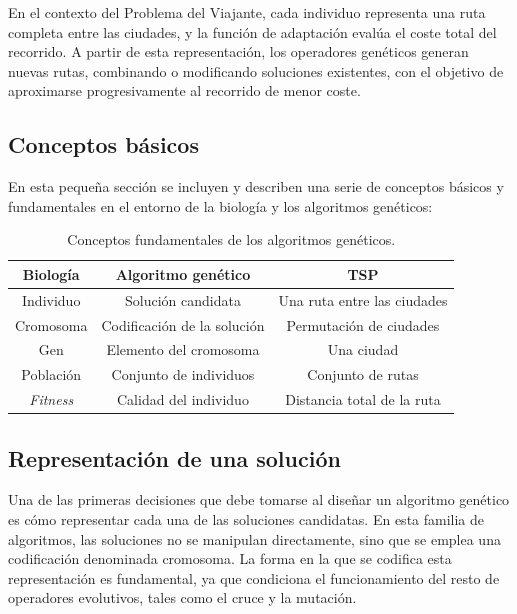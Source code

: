En el contexto del Problema del Viajante, cada individuo representa una ruta completa entre las ciudades, y la función de
adaptación evalúa el coste total del recorrido. A partir de esta representación, los operadores genéticos generan nuevas rutas, 
combinando o modificando soluciones existentes, con el objetivo de aproximarse progresivamente al recorrido de menor coste.

\subsection{Conceptos básicos}
\label{subsec:ga_concepts}

En esta pequeña sección se incluyen y describen una serie de conceptos básicos y fundamentales en el entorno de la biología y 
los algoritmos genéticos:

\begin{table}[ht]
    \renewcommand{\arraystretch}{1.3}
    \caption{Conceptos fundamentales de los algoritmos genéticos.}
    \label{tab:g_concepts}
    \begin{center}
        \begin{tabular}{|c|c|c|}
            \hline
            \textbf{Biología} & \textbf{Algoritmo genético} & \textbf{TSP} \\
            \hline
            Individuo & Solución candidata & Una ruta entre las ciudades \\
            \hline
            Cromosoma & Codificación de la solución & Permutación de ciudades \\
            \hline
            Gen & Elemento del cromosoma & Una ciudad \\
            \hline
            Población & Conjunto de individuos & Conjunto de rutas \\
            \hline
            \textit{Fitness} & Calidad del individuo & Distancia total de la ruta \\
            \hline
        \end{tabular}
    \end{center}
\end{table}

\subsection{Representación de una solución}
\label{subsec:ga_rep}

Una de las primeras decisiones que debe tomarse al diseñar un algoritmo genético es cómo representar cada una de las soluciones
candidatas. En esta familia de algoritmos, las soluciones no se manipulan directamente, sino que se emplea una codificación 
denominada cromosoma. La forma en la que se codifica esta representación es fundamental, ya que condiciona el funcionamiento del 
resto de operadores evolutivos, tales como el cruce y la mutación.

